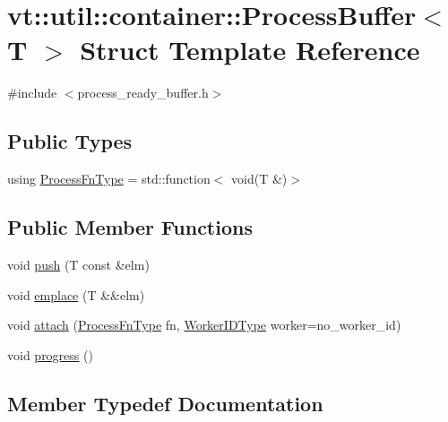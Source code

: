 \hypertarget{structvt_1_1util_1_1container_1_1_process_buffer}{}\section{vt\+:\+:util\+:\+:container\+:\+:Process\+Buffer$<$ T $>$ Struct Template Reference}
\label{structvt_1_1util_1_1container_1_1_process_buffer}


{\ttfamily \#include $<$process\+\_\+ready\+\_\+buffer.\+h$>$}

\subsection*{Public Types}
\begin{DoxyCompactItemize}
\item 
using \hyperlink{structvt_1_1util_1_1container_1_1_process_buffer_a20be3480fb453096015a6fe5ca370816}{Process\+Fn\+Type} = std\+::function$<$ void(T \&)$>$
\end{DoxyCompactItemize}
\subsection*{Public Member Functions}
\begin{DoxyCompactItemize}
\item 
void \hyperlink{structvt_1_1util_1_1container_1_1_process_buffer_a1fab9ef25e64fdab844f3e3d40699ad9}{push} (T const \&elm)
\item 
void \hyperlink{structvt_1_1util_1_1container_1_1_process_buffer_ae1bff94f45b85fa126a63b98c6c2e869}{emplace} (T \&\&elm)
\item 
void \hyperlink{structvt_1_1util_1_1container_1_1_process_buffer_ab8b25ce1820da72a1770778252dabfea}{attach} (\hyperlink{structvt_1_1util_1_1container_1_1_process_buffer_a20be3480fb453096015a6fe5ca370816}{Process\+Fn\+Type} fn, \hyperlink{namespacevt_a656e362091da17b9b93d0655b36e3392}{Worker\+I\+D\+Type} worker=no\+\_\+worker\+\_\+id)
\item 
void \hyperlink{structvt_1_1util_1_1container_1_1_process_buffer_aab87efa377b2b94320ba7c83b568b227}{progress} ()
\end{DoxyCompactItemize}


\subsection{Member Typedef Documentation}
\mbox{\label{structvt_1_1util_1_1container_1_1_process_buffer_a20be3480fb453096015a6fe5ca370816}} 
